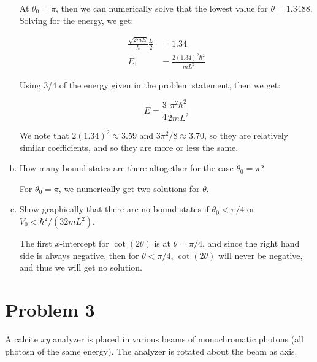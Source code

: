 \documentclass[10pt]{article}
\begin{document}
\begin{enumerate}[(a)]
        \begin{solution}
            At $\theta_0 = \pi$, then we can numerically solve that the lowest value for $\theta = 1.3488$. Solving for the energy, we get: 

            \begin{align*}
                \frac{\sqrt{2mE}}{\hbar} \frac{L}{2} &= 1.34\\
                E_1 &= \frac{2(1.34)^2 \hbar^2}{mL^2}
            \end{align*}

            Using 3/4 of the energy given in the problem statement, then we get: 

            \[ E = \frac{3}{4} \frac{\pi^2\hbar^2}{2mL^2}\] 

            We note that $2(1.34)^2 \approx 3.59$ and $3\pi^2/8 \approx 3.70$, so they are relatively similar coefficients, and so they are more or less the same. 
        \end{solution}
        \item How many bound states are there altogether for the case $\theta_0 = \pi$?
        
        \begin{solution}
            For $\theta_0 = \pi$, we numerically get two solutions for $\theta$.
        \end{solution}
        \item Show graphically that there are no bound states if $\theta_0 < \pi/4$ or $V_0 < \hbar^2/(32 mL^2)$. 
        
        \begin{solution}
            The first $x$-intercept for $\cot(2\theta)$ is at $\theta = \pi/4$, and since the right hand side is always negative, then for $\theta < \pi/4$, $\cot(2\theta)$ will never be negative, and thus we will get no solution.
        \end{solution}
    \end{enumerate}
    
    \pagebreak
    \section*{Problem 3}

    A calcite $xy$ analyzer is placed in various beams of monochromatic photons (all photosn of the same energy). The analyzer is rotated about the beam as axis. 
\end{document}
